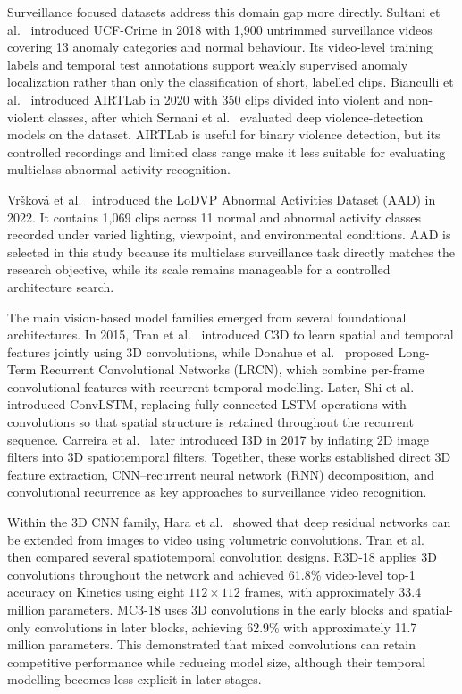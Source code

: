 \documentclass[journal,article,submit,moreauthors]{Definitions/mdpi}
\begin{document}
    Surveillance focused datasets address this domain gap more directly. Sultani et 
    al.~\cite{sultani2018} introduced UCF-Crime in 2018 with 1,900 untrimmed
    surveillance videos covering 13 anomaly categories and normal behaviour. Its
    video-level training labels and temporal test annotations support weakly 
    supervised anomaly localization rather than only the classification of short,
    labelled clips. Bianculli et al.~\cite{bianculli2020airtlab} introduced AIRTLab
    in 2020 with 350 clips divided into violent and non-violent classes, after 
    which Sernani et al.~\cite{sernani2021} evaluated deep violence-detection models
    on the dataset. AIRTLab is useful for binary violence detection, but its 
    controlled recordings and limited class range make it less suitable for 
    evaluating multiclass abnormal activity recognition.

    Vršková et al.~\cite{vrskova2022} introduced the LoDVP Abnormal Activities 
    Dataset (AAD) in 2022. It contains 1,069 clips across 11 normal and abnormal
    activity classes recorded under varied lighting, viewpoint, and environmental 
    conditions. AAD is selected in this study because its multiclass surveillance 
    task directly matches the research objective, while its scale remains manageable
    for a controlled architecture search.

    The main vision-based model families emerged from several foundational 
    architectures. In 2015, Tran et al.~\cite{tran2015c3d} introduced C3D to learn 
    spatial and temporal features jointly using 3D convolutions, while Donahue et 
    al.~\cite{donahue2015lrcn} proposed Long-Term Recurrent Convolutional Networks
    (LRCN), which combine per-frame convolutional
    features with recurrent temporal modelling. Later, 
    Shi et al.~\cite{xingjian2015convlstm} introduced ConvLSTM, replacing fully 
    connected LSTM operations with convolutions so that spatial structure is retained
    throughout the recurrent sequence. Carreira et al.~\cite{carreira2017i3d} later
    introduced I3D in 2017 by inflating 2D image filters into 3D spatiotemporal
    filters. Together, these works established direct 3D feature extraction, 
    CNN--recurrent neural network (RNN) decomposition, and convolutional recurrence
    as key approaches to
    surveillance video recognition.

    Within the 3D CNN family, Hara et al.~\cite{hara2018resnet3d} showed that 
    deep residual networks can be extended from images to video using volumetric 
    convolutions. Tran et al.~\cite{tran2018closer} then compared several 
    spatiotemporal convolution designs. R3D-18 applies 3D convolutions throughout 
    the network and achieved 61.8\% video-level top-1 accuracy on Kinetics 
    using eight $112\times112$ frames, with approximately 33.4 million parameters. 
    MC3-18 uses 3D convolutions in the early blocks and spatial-only convolutions
    in later blocks, achieving 62.9\% with approximately 11.7 million parameters. 
    This demonstrated that mixed convolutions can retain competitive performance 
    while reducing model size, although their temporal modelling becomes less 
    explicit in later stages.
\end{document}
